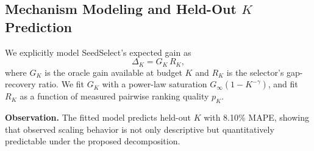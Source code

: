 \subsection{Mechanism Modeling and Held-Out $K$ Prediction}
\label{sec:mechanism-model}

We explicitly model SeedSelect's expected gain as
\begin{equation}
\Delta_K = G_K\,R_K,
\end{equation}
where $G_K$ is the oracle gain available at budget $K$ and $R_K$ is the selector's gap-recovery ratio. We fit $G_K$ with a power-law saturation $G_\infty(1-K^{-\gamma})$, and fit $R_K$ as a function of measured pairwise ranking quality $p_K$.



\noindent\textbf{Observation.}
The fitted model predicts held-out $K$ with 8.10\% MAPE, showing that observed scaling behavior is not only descriptive but quantitatively predictable under the proposed decomposition.
